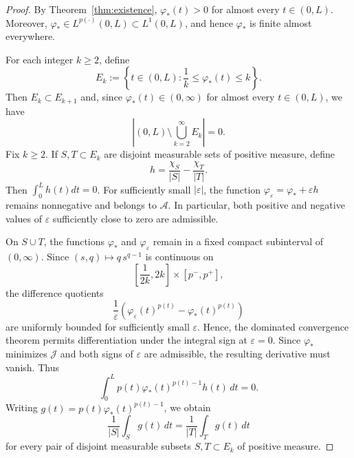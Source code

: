 \documentclass[12pt]{amsart}
\numberwithin{equation}{section}
\theoremstyle{plain}
\theoremstyle{definition}
\begin{document}
\begin{proof}
By Theorem~\ref{thm:existence}, $\varphi_*(t)>0$ for almost every $t\in(0,L)$.
Moreover, $\varphi_*\in L^{p(\cdot)}(0,L)\subset L^1(0,L)$, and hence
$\varphi_*$ is finite almost everywhere.

For each integer $k\ge2$, define
\begin{equation*}
E_k
:=
\left\{
t\in(0,L):
\frac1k\le\varphi_*(t)\le k
\right\}.
\end{equation*}
Then
$E_k\subset E_{k+1}$
and, since $\varphi_*(t)\in(0,\infty)$ for almost every
$t\in(0,L)$, we have
\begin{equation*}
\left|(0,L)\setminus\bigcup_{k=2}^{\infty}E_k\right|=0.
\end{equation*}
Fix $k\ge2$. If $S,T\subset E_k$ are disjoint measurable sets of
positive measure, define
\begin{equation}\label{fun-h}
h
=
\frac{\chi_S}{|S|}
-
\frac{\chi_T}{|T|}.
\end{equation}
Then $\int_0^L h(t)dt=0$.
For sufficiently small $|\varepsilon|$, the function
$\varphi_\varepsilon
=
\varphi_*+\varepsilon h$
remains nonnegative and belongs to $\mathcal A$. In particular, both
positive and negative values of $\varepsilon$ sufficiently close to
zero are admissible.

On $S\cup T$, the functions $\varphi_*$ and
$\varphi_\varepsilon$ remain in a fixed compact subinterval of
$(0,\infty)$. Since
$(s,q)\longmapsto q\,s^{q-1}$
is continuous on
\begin{equation*}
\left[\frac{1}{2k},2k\right]\times[p^-,p^+],
\end{equation*}
the difference quotients
\begin{equation*}
\frac{1
}{\varepsilon}\left(\varphi_\varepsilon(t)^{p(t)}
-
\varphi_*(t)^{p(t)}\right)
\end{equation*}
are uniformly bounded for sufficiently small $\varepsilon$. Hence, the
dominated convergence theorem permits differentiation under the
integral sign at $\varepsilon=0$. Since $\varphi_*$ minimizes
$\mathcal J$ and both signs of $\varepsilon$ are admissible, the
resulting derivative must vanish. Thus
\begin{equation*}
\int_0^L
p(t)\varphi_*(t)^{p(t)-1}h(t)\,dt
=
0.
\end{equation*}
Writing
$g(t)
=
p(t)\varphi_*(t)^{p(t)-1}$,
we obtain
\begin{equation}
\label{eq:equal_averages}
\frac{1}{|S|}\int_S g(t)\,dt
=
\frac{1}{|T|}\int_T g(t)\,dt
\end{equation}
for every pair of disjoint measurable subsets $S,T\subset E_k$ of
positive measure.


\end{proof}
\end{document}
